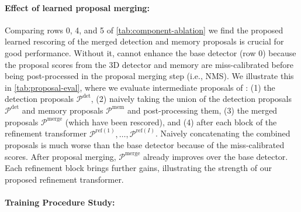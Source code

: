 \paragraph{Effect of learned proposal merging:}
Comparing rows 0, 4, and 5 of \cref{tab:component-ablation} we find the proposed learned rescoring of the merged detection and memory proposals is crucial for good performance.
Without it, \ourmodel{} cannot enhance the base detector (row 0) because the proposal scores from the 3D detector and memory are miss-calibrated before being post-processed in the proposal merging step (i.e., NMS).
We illustrate this in \cref{tab:proposal-eval}, where we evaluate intermediate proposals of \ourmodel{}:
(1) the detection proposals $\mathcal{P}^\mathrm{det}$,
(2) naively taking the union of the detection proposals $\mathcal{P}^\mathrm{det}$ and memory proposals $\mathcal{P}^\mathrm{mem}$ and post-processing them, %
(3) the merged proposals $\mathcal{P}^\mathrm{merge}$ (which have been rescored), and
(4) after each block of the refinement transformer $\mathcal{P}^{\mathrm{ref}(1)}, \dots, \mathcal{P}^{\mathrm{ref}(I)}$.
Naively concatenating the combined proposals is much worse than the base detector because of the miss-calibrated scores.
After proposal merging, $\mathcal{P}^\mathrm{merge}$ already improves over the base detector.
Each refinement block brings further gains, illustrating the strength of our proposed refinement transformer.



\paragraph{Training Procedure Study:}


